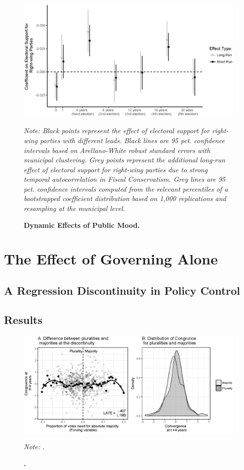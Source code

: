 \documentclass[a4paper,12pt]{article}
\newcommand\fnote[1]{\captionsetup{font=small}\caption*{#1}}
\begin{document}
\begin{figure}[h]
	\centering
	\includegraphics[scale = .8]{coef_on_varying_leads.eps}
	\caption{\textbf{Dynamic Effects of Public Mood.}} \fnote{\emph{Note: Black points represent the effect of electoral support for right-wing parties with different leads. Black lines are 95 pct. confidence intervals based on Arellano-White robust standard errors with municipal clustering. Grey points represent the additional long-run effect of electoral support for right-wing parties due to strong temporal autocorrelation in Fiscal Conservatism. Grey lines are 95 pct. confidence intervals computed from the relevant percentiles of a bootstrapped coefficient distribution based on 1,000 replications and resampling at the municipal level.}}
	\label{fig:LongRun}
\end{figure}



\section{The Effect of Governing Alone}

\subsection{A Regression Discontinuity in Policy Control}

\subsection{Results}

\begin{landscape}
	\begin{figure}[h]
		\centering
		\includegraphics[scale = 1]{rddCongruence.eps}
		\caption{\textbf{.}} \fnote{\emph{Note: .}}
		\label{fig:PermTest}
	\end{figure}
\end{landscape}
	
\end{document}
